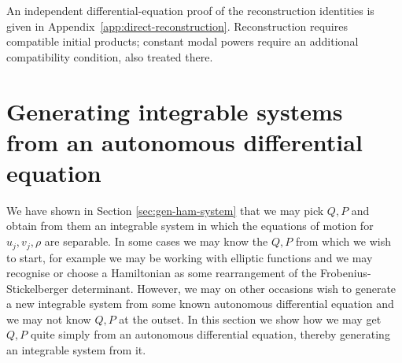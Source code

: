 \documentclass[11pt,a4paper]{article}
\numberwithin{equation}{section}
\begin{document}
An independent differential-equation proof of the reconstruction identities is given in Appendix~\ref{app:direct-reconstruction}. Reconstruction requires compatible initial products; constant modal powers require an additional compatibility condition, also treated there.

\section{Generating integrable systems from an autonomous differential equation}
\label{sec:ode-generation}

We have shown in Section \ref{sec:gen-ham-system} that we may pick $Q, P$ and obtain from them an integrable system in which the equations of motion for $u_j, v_j, \rho$ are separable.
In some cases we may know the $Q,P$ from which we wish to start, for example we may be working with elliptic functions and we may recognise or choose a Hamiltonian as some rearrangement of the Frobenius-Stickelberger determinant.
However, we may on other occasions wish to generate a new integrable system from some known autonomous differential equation and we may not know $Q, P$ at the outset.
In this section we show how we may get $Q, P$ quite simply from an autonomous differential equation, thereby generating an integrable system from it.
\end{document}
